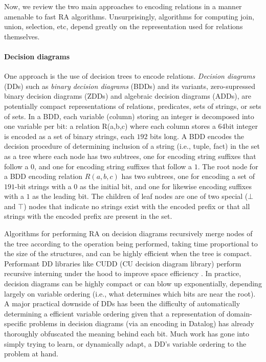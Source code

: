 Now, we review the two main approaches to encoding relations in a manner amenable to fast RA algorithms. Unsurprisingly, algorithms for computing join, union, selection, etc, depend greatly on the representation used for relations themselves. 

\paragraph{Decision diagrams} One approach is the use of decision trees to encode relations. \emph{Decision diagrams} (DDs) such as \emph{binary decision diagrams} (BDDs) and its variants, zero-supressed binary decision diagrams (ZDDs) and algebraic decision diagrams (ADDs), are potentially compact representations of relations, predicates, sets of strings, or sets of sets. In a BDD, each variable (column) storing an integer is decomposed into one variable per bit: a relation R(a,b,c) where each column stores a 64bit integer is encoded as a set of binary strings, each $192$ bits long. A BDD encodes the decision procedure of determining inclusion of a string (i.e., tuple, fact) in the set as a tree where each node has two subtrees, one for encoding string suffixes that follow a $0$, and one for encoding string suffixes that follow a $1$. The root node for a BDD encoding relation $R(a,b,c)$ has two subtrees, one for encoding a set of $191$-bit strings with a $0$ as the initial bit, and one for likewise encoding suffixes with a $1$ as the leading bit. The children of leaf nodes are one of two special ($\bot$ and $\top$) nodes that indicate no strings exist with the encoded prefix or that all strings with the encoded prefix are present in the set. 

Algorithms for performing RA on decision diagrams recursively merge nodes of the tree according to the operation being performed, taking time proportional to the size of the structures, and can be highly efficient when the tree is compact. Performant DD libraries like CUDD (CU decision diagram library) perform recursive interning under the hood to improve space efficiency \cite{somenzi1998cudd}. In practice, decision diagrams can be highly compact or can blow up exponentially, depending largely on variable ordering (i.e., what determines which bits are near the root). A major practical downside of DDs has been the difficulty of automatically determining a efficient variable ordering given that a representation of domain-specific problems in decision diagrams (via an encoding in Datalog) has already thoroughly obfuscated the meaning behind each bit. Much work has gone into simply trying to learn, or dynamically adapt, a DD's variable ordering to the problem at hand. 

